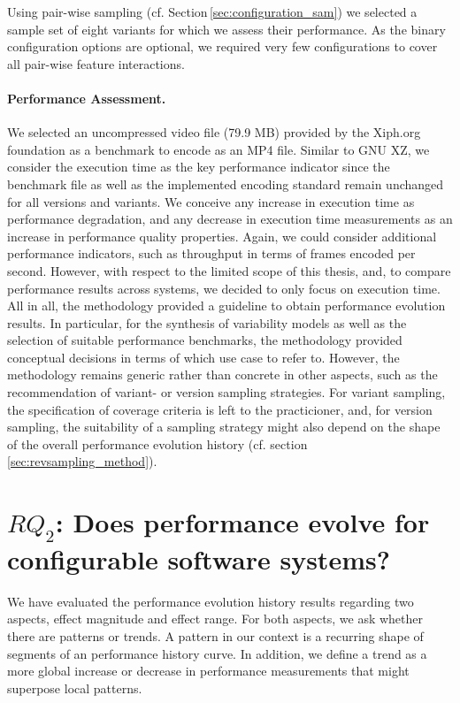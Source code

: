 Using pair-wise sampling (cf. Section\,\ref{sec:configuration_sam}) we selected
a sample set of eight variants for which we assess their performance. As the binary configuration
options are optional, we required very few configurations to cover all
pair-wise feature interactions.

\paragraph{Performance Assessment.} We selected an uncompressed video file (79.9
MB) provided by the Xiph.org foundation as a benchmark to encode as an MP4 file.
Similar to GNU XZ, we consider the execution time as the key performance
indicator since the benchmark file as well as the implemented encoding standard
remain unchanged for all versions and variants. We conceive any increase in
execution time as performance degradation, and any decrease in execution time
measurements as an increase in performance quality properties. Again, we could
consider additional performance indicators, such as throughput in terms of
frames encoded per second. However, with respect to the limited scope of this
thesis, and, to compare performance results across systems, we decided to only
focus on execution time.\\

All in all, the methodology provided a guideline to obtain
performance evolution results. In particular, for the synthesis of variability
models as well as the selection of suitable performance benchmarks, the
methodology provided conceptual decisions in terms of which use case to refer
to. However, the methodology remains generic rather than concrete in other
aspects, such as the recommendation of variant- or version sampling strategies.
For variant sampling, the specification of coverage criteria is left to the
practicioner, and, for version sampling, the suitability of a sampling strategy
might also depend on the shape of the overall performance evolution history
(cf. section\,\ref{sec:revsampling_method}).

\section{$RQ_2$: Does performance evolve for configurable software systems?}\label{sec:expresults}
We have evaluated the performance evolution history results regarding two
aspects, effect magnitude and effect range. For both aspects, we ask whether
there are patterns or trends. A pattern in our context is a recurring shape of
segments of an performance history curve. In addition, we define a trend as a
more global increase or decrease in performance measurements that might
superpose local patterns.

